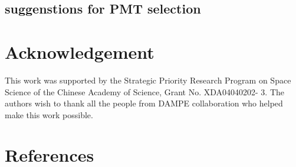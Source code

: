 \documentclass[5p, times]{elsarticle}
\begin{document}
\subsection{suggenstions for PMT selection}

\section*{Acknowledgement}
\label{sec:acknowledgement}

This work was supported by the Strategic Priority Research Program on Space Science of the Chinese Academy of Science,
Grant No. XDA04040202- 3. The authors wish to thank all the people from DAMPE collaboration who helped make this work
possible.

\section*{References}
\label{sec:reference}



\end{document}
